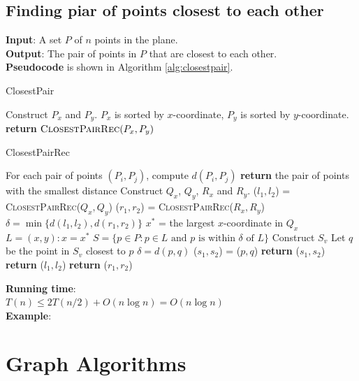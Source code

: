 \documentclass[onecolumn]{report}
\begin{document}
\section{Finding piar of points closest to each other}
\textbf{Input}: A set $P$ of $n$ points in the plane.\\
\textbf{Output}: The pair of points in $P$ that are closest to each other.\\
\textbf{Pseudocode} is shown in Algorithm \ref{alg:closestpair}.
\begin{algorithm}
\label{alg:closestpair}
\caption{ClosestPair}
\begin{algorithmic}[1]
\State Construct $P_x$ and $P_y$. $P_x$ is sorted by $x$-coordinate, $P_y$ is sorted by $y$-coordinate.
\State \textbf{return} $\textsc{ClosestPairRec}(P_x,P_y)$
\EndProcedure
\end{algorithmic}
\end{algorithm}
\begin{algorithm}
\caption{ClosestPairRec}
\begin{algorithmic}[1]
\State For each pair of points $(P_i,P_j)$, compute $d(P_i,P_j)$
\State \textbf{return} the pair of points with the smallest distance
\EndIf
\State Construct $Q_x$, $Q_y$, $R_x$ and $R_y$.
\State ($l_1,l_2$) = \textsc{ClosestPairRec}($Q_x,Q_y$)
\State ($r_1,r_2$) = \textsc{ClosestPairRec}($R_x,R_y$)
\State $\delta = \min\{d(l_1,l_2),d(r_1,r_2)\}$
\State $x^*$ = the largest $x$-coordinate in $Q_x$
\State $L = {(x,y):x=x^*}$
\State $S = \{p \in P: p \in L \text{ and } p \text{ is within } \delta \text{ of } L\}$
\State Construct $S_v$ 
\State Let $q$ be the point in $S_v$ closest to $p$
\State $\delta = d(p,q)$
\State ($s_1,s_2$) = ($p,q$)
\EndIf
\EndFor
{}
\State \textbf{return} ($s_1,s_2$)
\EndIf
{}
\State \textbf{return} ($l_1,l_2$)
\Else
\State \textbf{return} ($r_1,r_2$)
\EndIf
\EndProcedure
\end{algorithmic}
\end{algorithm}
\textbf{Running time}:\\
$T(n) \leq 2T(n/2) + O(n\log n) = O(n\log n)$\\
\textbf{Example}:\\

\chapter{Graph Algorithms}
\end{document}
